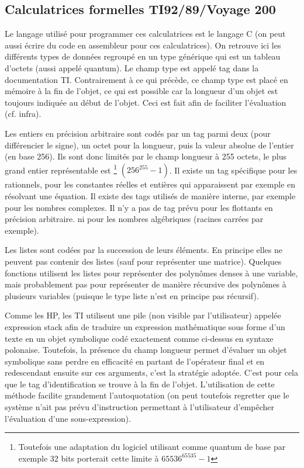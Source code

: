 \documentclass[a4paper,11pt]{book}
\begin{document}
\begin{giacjshere}
\subsection{Calculatrices formelles TI92/89/Voyage 200}
Le langage utilis\'e pour programmer ces calculatrices est le langage C
(on peut aussi \'ecrire du code en assembleur pour ces calculatrices).
On retrouve ici les diff\'erents types de donn\'ees regroup\'e en un
type g\'en\'erique qui est un tableau d'octets (aussi appelé quantum). 
Le champ type
est appel\'e tag dans la documentation TI. Contrairement \`a ce qui
pr\'ec\`ede, ce champ type est plac\'e en m\'emoire \`a la fin de l'objet,
ce qui est possible car la longueur d'un objet est toujours indiqu\'ee
au d\'ebut de l'objet. Ceci est fait afin de faciliter l'évaluation (cf.
infra).

Les entiers en précision arbitraire sont codés par un tag parmi deux (pour
différencier le signe), un octet pour la longueur, puis la valeur
absolue de l'entier (en base 256). Ils sont donc limités par le
champ longueur à 255 octets, le plus grand entier représentable est
\footnote{Toutefois une adaptation du logiciel utilisant comme
quantum de base par exemple 32 bits porterait cette limite
à $65536^{65535}-1$} $(256^{255}-1)$.
Il existe un tag spécifique pour les rationnels, pour les constantes 
réelles et entières qui apparaissent par exemple en r\'esolvant une \'equation.
Il existe des tags utilisés de manière interne, par exemple
pour les nombres complexes. 
Il n'y a pas de tag prévu pour les flottants en précision arbitraire.
ni pour les nombres algébriques (racines carrées par 
exemple).

Les listes sont codées par la succession de leurs éléments. En principe
elles ne peuvent pas contenir des listes (sauf pour repr\'esenter
une matrice).
Quelques fonctions utilisent les listes pour représenter des polynômes 
denses à une variable, mais probablement pas pour représenter de manière
récursive des polynômes à plusieurs variables (puisque le type liste
n'est en principe pas récursif).

Comme les HP, les TI utilisent une pile (non visible par
l'utilisateur) appelée expression stack
afin de traduire un expression math\'ematique sous forme d'un texte
en un objet symbolique cod\'e exactement comme ci-dessus en syntaxe
polonaise. Toutefois, la pr\'esence du champ longueur
permet d'\'evaluer un objet symbolique sans perdre en efficacit\'e
en partant de l'op\'erateur
final et en redescendant ensuite sur ces arguments, c'est la stratégie
adoptée. C'est pour cela que le tag d'identification
se trouve à la fin de l'objet. L'utilisation de cette méthode
facilite grandement l'autoquotation (on peut toutefois regretter
que le système n'ait pas prévu d'instruction permettant à l'utilisateur 
d'emp\^echer l'évaluation d'une sous-expression).


\end{giacjshere}
\end{document}
